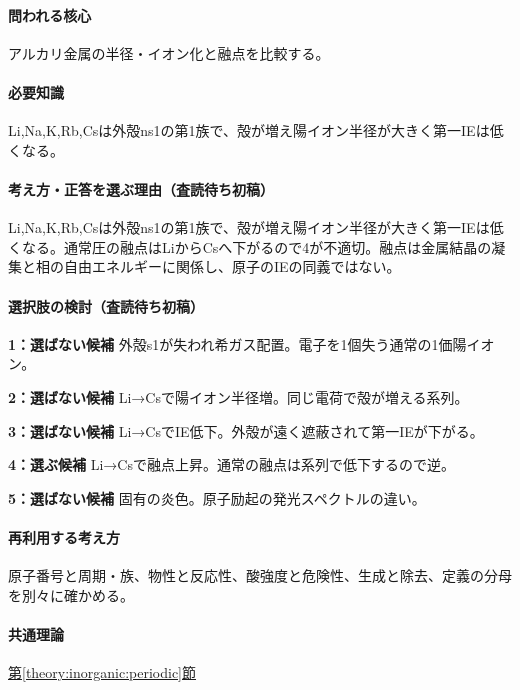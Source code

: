 \paragraph{問われる核心} アルカリ金属の半径・イオン化と融点を比較する。

\paragraph{必要知識} Li,Na,K,Rb,Csは外殻ns1の第1族で、殻が増え陽イオン半径が大きく第一IEは低くなる。

\paragraph{考え方・正答を選ぶ理由（査読待ち初稿）} Li,Na,K,Rb,Csは外殻ns1の第1族で、殻が増え陽イオン半径が大きく第一IEは低くなる。通常圧の融点はLiからCsへ下がるので4が不適切。融点は金属結晶の凝集と相の自由エネルギーに関係し、原子のIEの同義ではない。

\paragraph{選択肢の検討（査読待ち初稿）}\mbox{}\par

\noindent\textbf{1：選ばない候補} 外殻s1が失われ希ガス配置。電子を1個失う通常の1価陽イオン。\par

\noindent\textbf{2：選ばない候補} Li→Csで陽イオン半径増。同じ電荷で殻が増える系列。\par

\noindent\textbf{3：選ばない候補} Li→CsでIE低下。外殻が遠く遮蔽されて第一IEが下がる。\par

\noindent\textbf{4：選ぶ候補} Li→Csで融点上昇。通常の融点は系列で低下するので逆。\par

\noindent\textbf{5：選ばない候補} 固有の炎色。原子励起の発光スペクトルの違い。\par

\paragraph{再利用する考え方} 原子番号と周期・族、物性と反応性、酸強度と危険性、生成と除去、定義の分母を別々に確かめる。

\paragraph{共通理論} \hyperref[theory:inorganic:periodic]{第\ref*{theory:inorganic:periodic}節}

